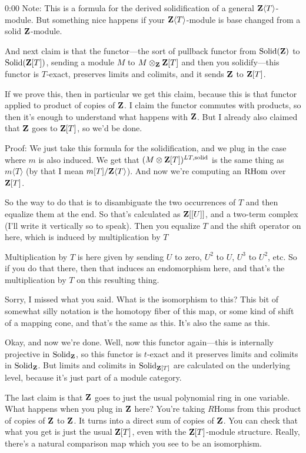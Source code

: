 \begin{unfinished}{0:00}
Note: This is a formula for the derived solidification of a general $\mathbf Z\langle T \rangle$-module. But something nice happens if your $\mathbf Z\langle T \rangle$-module is base changed from a solid $\mathbf Z$-module.

And next claim is that the functor---the sort of pullback functor from $\mathrm{Solid}(\mathbf Z)$ to $\mathrm{Solid}(\mathbf Z[T])$, sending a module $M$ to $M\otimes_\mathbf Z\mathbf Z[T]$ and then you solidify---this functor is $T$-exact, preserves limits and colimits, and it sends $\mathbf Z$ to $\mathbf Z[T]$.

If we prove this, then in particular we get this claim, because this is that functor applied to product of copies of $\mathbf Z$. I claim the functor commutes with products, so then it's enough to understand what happens with $\mathbf Z$. But I already also claimed that $\mathbf Z$ goes to $\mathbf Z[T]$, so we'd be done.

Proof: We just take this formula for the solidification, and we plug in the case where $m$ is also induced. We get that $(M\otimes \mathbf Z[T])^{LT,\mathrm{solid}}$ is the same thing as $m\langle T\rangle$ (by that I mean $m[T]/\mathbf Z\langle T\rangle$). And now we're computing an $\operatorname{RHom}$ over $\mathbf Z[T]$.

So the way to do that is to disambiguate the two occurrences of $T$ and then equalize them at the end. So that's calculated as $\mathbf Z[[U]]$, and a two-term complex (I'll write it vertically so to speak). Then you equalize $T$ and the shift operator on here, which is induced by multiplication by $T$

Multiplication by $T$ is here given by sending $U$ to zero, $U^2$ to $U$, $U^3$ to $U^2$, etc. So if you do that there, then that induces an endomorphism here, and that's the multiplication by $T$ on this resulting thing.

Sorry, I missed what you said. What is the isomorphism to this? This bit of somewhat silly notation is the homotopy fiber of this map, or some kind of shift of a mapping cone, and that's the same as this. It's also the same as this.

Okay, and now we're done. Well, now this functor again---this is internally projective in $\mathrm{Solid}_\mathbf Z$, so this functor is $t$-exact and it preserves limits and colimits in $\mathrm{Solid}_\mathbf Z$. But limits and colimits in $\mathrm{Solid}_{\mathbf Z[T]}$ are calculated on the underlying level, because it's just part of a module category.

The last claim is that $\mathbf Z$ goes to just the usual polynomial ring in one variable. What happens when you plug in $\mathbf Z$ here? You're taking $R\mathrm{Hom}$s from this product of copies of $\mathbf Z$ to $\mathbf Z$. It turns into a direct sum of copies of $\mathbf Z$. You can check that what you get is just the usual $\mathbf Z[T]$, even with the $\mathbf Z[T]$-module structure. Really, there's a natural comparison map which you see to be an isomorphism.


\end{unfinished}
